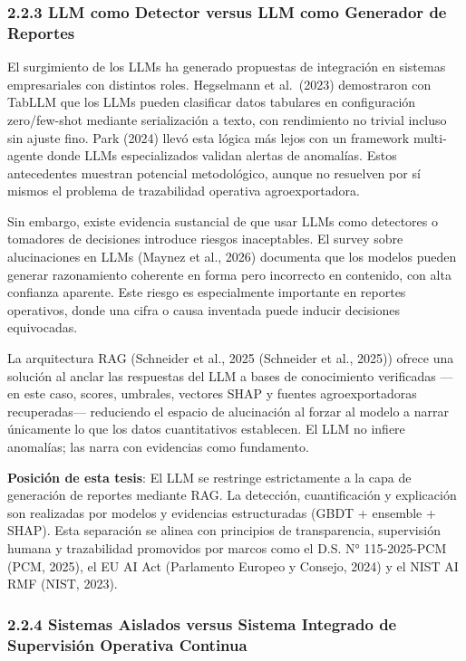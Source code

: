 \subsubsection{2.2.3 LLM como Detector versus LLM como Generador de
Reportes}\label{llm-como-detector-versus-llm-como-generador-de-reportes}

El surgimiento de los LLMs ha generado propuestas de integración en
sistemas empresariales con distintos roles. Hegselmann et al.~(2023)
demostraron con TabLLM que los LLMs pueden clasificar datos tabulares en
configuración zero/few-shot mediante serialización a texto, con
rendimiento no trivial incluso sin ajuste fino. Park (2024) llevó esta
lógica más lejos con un framework multi-agente donde LLMs especializados
validan alertas de anomalías. Estos antecedentes muestran potencial
metodológico, aunque no resuelven por sí mismos el problema de
trazabilidad operativa agroexportadora.

Sin embargo, existe evidencia sustancial de que usar LLMs como
detectores o tomadores de decisiones introduce riesgos inaceptables. El
survey sobre alucinaciones en LLMs (Maynez et al., 2026) documenta que
los modelos pueden generar razonamiento coherente en forma pero
incorrecto en contenido, con alta confianza aparente. Este riesgo es
especialmente importante en reportes operativos, donde una cifra o causa
inventada puede inducir decisiones equivocadas.

La arquitectura RAG (Schneider et al., 2025 (Schneider et al., 2025))
ofrece una solución al anclar las respuestas del LLM a bases de
conocimiento verificadas ---en este caso, scores, umbrales, vectores
SHAP y fuentes agroexportadoras recuperadas--- reduciendo el espacio de
alucinación al forzar al modelo a narrar únicamente lo que los datos
cuantitativos establecen. El LLM no infiere anomalías; las narra con
evidencias como fundamento.

\textbf{Posición de esta tesis}: El LLM se restringe estrictamente a la
capa de generación de reportes mediante RAG. La detección,
cuantificación y explicación son realizadas por modelos y evidencias
estructuradas (GBDT + ensemble + SHAP). Esta separación se alinea con
principios de transparencia, supervisión humana y trazabilidad
promovidos por marcos como el D.S. N° 115-2025-PCM (PCM, 2025), el EU AI
Act (Parlamento Europeo y Consejo, 2024) y el NIST AI RMF (NIST, 2023).

\subsubsection{2.2.4 Sistemas Aislados versus Sistema Integrado de
Supervisión Operativa
Continua}\label{sistemas-aislados-versus-sistema-integrado-de-supervisiuxf3n-operativa-continua}

